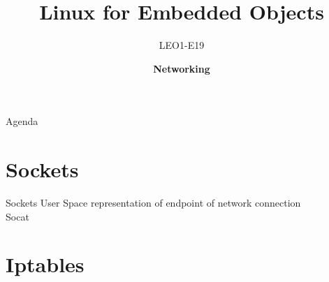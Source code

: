 \documentclass[aspectratio=169,10pt,t]{beamer}
\title{Linux for Embedded Objects}
\subtitle{LEO1-E19}
\date{ }
\author{
  \textbf{Networking}
}
\institute[
  SDU Robotics\\
  The Maersk Mc-Kinney Moller Institute\\
  University of Southern Denmark
] %
{%
  The Maersk Mc-Kinney Moller Institute\\
  University of Southern Denmark

}
\begin{document}
{\SDUwavesbg%
\begin{frame} %
  \titlepage
\end{frame}}

\begin{frame}{Agenda}{\vphantom{(y}}
\tableofcontents
\end{frame}

\section{Sockets}%
\label{sec:sockets}


\begin{frame}[t]{Sockets}
	User Space representation of endpoint of network connection\\
	Socat
	
	


\end{frame}

\section{Iptables}%
\label{sec:iptables}
\end{document}
